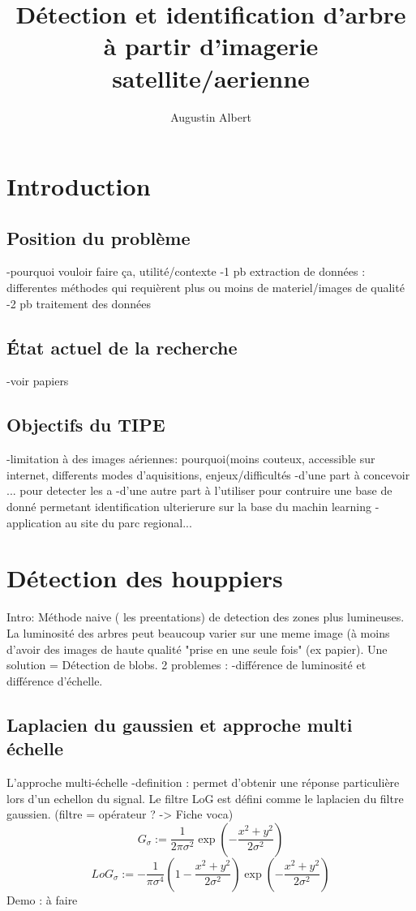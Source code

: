 \documentclass{article}
\title{Détection et identification d'arbre à partir d'imagerie satellite/aerienne}
\author{Augustin Albert}
\begin{document}
\maketitle
\tableofcontents

\section*{Introduction}
	\subsection*{Position du problème}
		-pourquoi vouloir faire ça, utilité/contexte	
		-1 pb extraction de données : differentes méthodes qui requièrent plus ou moins de materiel/images de qualité
		-2 pb traitement des données

	\subsection*{\'{E}tat actuel de la recherche}
		-voir papiers 

	\subsection*{Objectifs du TIPE}		
		-limitation à des images aériennes: pourquoi(moins couteux, accessible sur internet, differents modes d'aquisitions,  enjeux/difficultés
		-d'une part à concevoir ... pour detecter les a
		-d'une autre part à l'utiliser pour contruire une base de donné permetant identification ulterierure sur la base du machin learning
		-application au site du parc regional...
		
\section{Détection des houppiers}
	Intro: Méthode naive ( les preentations) de detection des zones plus lumineuses. La luminosité des arbres peut beaucoup varier sur une meme image (à moins d'avoir des images de haute qualité "prise en une seule fois" (ex papier). Une solution = Détection de blobs. 2 problemes : -différence de luminosité et différence d'échelle.

	\subsection{Laplacien du gaussien  et approche multi échelle}
		L'approche multi-échelle 
		-definition : permet d'obtenir une réponse particulière lors d'un echellon du signal. Le filtre LoG est défini comme le laplacien du filtre gaussien. (filtre = opérateur ? -> Fiche voca)
		\[G_{\sigma}:=\frac{1}{2\pi\sigma^{2}}\exp(-\frac{x^{2}+y^{2}}{2\sigma^{2}})\]
		\[{LoG}_{\sigma}:=-\frac{1}{\pi\sigma^{4}}(1-\frac{x^{2}+y^{2}}{2\sigma^{2}})\exp(-\frac{x^{2}+y^{2}}{2\sigma^{2}})\] 
		Demo : à faire 
\end{document}

